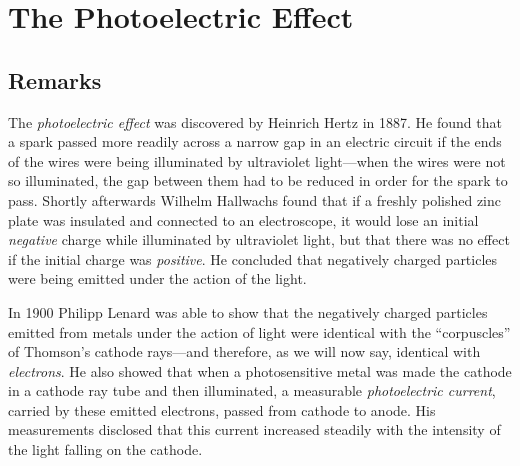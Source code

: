 \chapter{The Photoelectric Effect}


\renewcommand{\theequation}{\arabic{equation}}

\section*{Remarks}

The \emph{photoelectric effect} was discovered by Heinrich Hertz in
1887. He found that a spark passed more readily across a narrow gap in
an electric circuit if the ends of the wires were being illuminated by
ultraviolet light---when the wires were not so illuminated, the gap
between them had to be reduced in order for the spark to pass. Shortly
afterwards Wilhelm Hallwachs found that if a freshly polished zinc plate
was insulated and connected to an electroscope, it would lose an initial
\emph{negative} charge while illuminated by ultraviolet light, but that
there was no effect if the initial charge was \emph{positive}. He
concluded that negatively charged particles were being emitted under the
action of the light.

In 1900 Philipp Lenard was able to show that the negatively charged
particles emitted from metals under the action of light were identical
with the ``corpuscles'' of Thomson's cathode rays---and therefore, as we
will now say, identical with \emph{electrons}. He also showed that when
a photosensitive metal was made the cathode in a cathode ray tube and
then illuminated, a measurable \emph{photoelectric current}, carried by
these emitted electrons, passed from cathode to anode. His measurements
disclosed that this current increased steadily with the intensity of the
light falling on the cathode.

